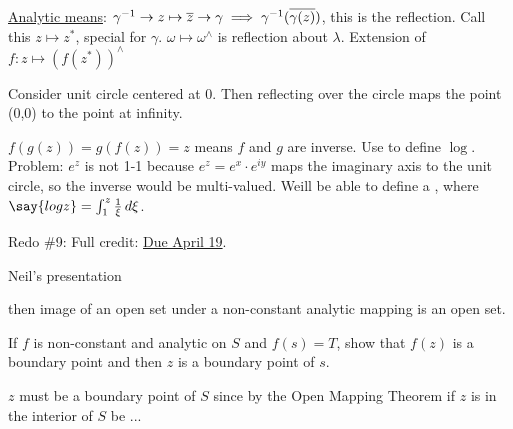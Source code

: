 \documentclass[]{article}
\begin{document}
\underline{Analytic means}: $\gamma^{-1} \rightarrow z\mapsto \overline{z} \rightarrow \gamma \implies \gamma^{-1}(\overline{\gamma(z)})$, this is the reflection. Call this $z\mapsto z^*$, special for $\gamma$. $\omega \mapsto \omega^\wedge$ is reflection about $\lambda$. Extension of $f: z\mapsto (f(z^*))^\wedge$

\begin{example}
	Consider unit circle centered at 0. Then reflecting over the circle maps the point (0,0) to the point at infinity.
\end{example}

$f(g(z)) = g(f(z)) = z $ means $f$ and $g$ are inverse. Use to define $\log$. Problem: $e^z$ is not 1-1 because $e^z = e^x \cdot e^{iy}$ maps the imaginary axis to the unit circle, so the inverse would be multi-valued. Weill be able to define a , where $\say{log{z}} = \int_1^z \frac{1}{\xi} \, d\xi$.





Redo \#9: Full credit: \underline{Due April 19}.

Neil's presentation
\begin{recall}
	 then image of an open set under a non-constant analytic mapping is an open set.
\end{recall}
\begin{example}
	[3a)] If $f$ is non-constant and analytic on $S$ and $f(s) = T$, show that $f(z)$ is a boundary point  and then $z$ is a boundary point of $s$.
	
	$z$ must be a boundary point of $S$ since by the Open Mapping Theorem if $z$ is in the interior of $S$ be ...
\end{example}
\end{document}
